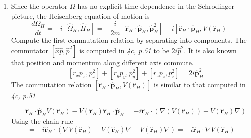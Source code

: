 \begin{sol}
\begin{enumerate}[label=\textbf{(\alph*)}]
\item
Since the operator $\Omega$ has no explicit time dependence in the Schrodinger picture, the Heisenberg equation of motion is
\begin{equation}
	\frac{d\Omega_H}{dt}=-i[\hat\Omega_H,\hat H_H]=-\frac{i}{2m}[\hat{\mathbf r}_H\cdot \hat{\mathbf p}_H,\hat{\mathbf p}_H^2]-i[\hat{\mathbf r}_H\cdot \hat{\mathbf p}_H,V(\hat {\mathbf{r}}_H)]
\end{equation}  
Compute the first commutation relation by separating into components. The commutator $[\hat x\hat p,\hat p^2]$ is computed in \textit{4c, p.51} to be $2i\hat p^2$. It is also known that position and momentum along different axis commute.
\begin{equation}
	[\hat{\mathbf r}_H\cdot \hat{\mathbf p}_H,\hat{\mathbf p}_H^2]=[r_xp_x,p_x^2]+[r_yp_y,p_y^2]+[r_zp_z,p_z^2]=2i\hat{\mathbf p}_H^2
\end{equation}
The commutation relation $[\hat{\mathbf r}_H\cdot \hat{\mathbf p}_H,V(\hat {\mathbf{r}}_H)]$ is similar to that computed in \textit{4c, p.51}

\begin{equation}
	[\hat{\mathbf r}_H\cdot \hat{\mathbf p}_H,V(\hat {\mathbf{r}}_H)]=\hat{\mathbf r}_H\cdot \hat{\mathbf p}_HV(\hat {\mathbf{r}}_H)-V(\hat {\mathbf{r}}_H)\hat{\mathbf r}_H\cdot \hat{\mathbf p}_H=-i\hat{ \mathbf r}_H\cdot(\nabla( V(\hat {\mathbf{r}}_H))-V(\hat {\mathbf{r}}_H)\nabla)
\end{equation} 
Using the chain rule
\begin{equation}
	=-i\hat{ \mathbf r}_H\cdot(\nabla V(\hat {\mathbf{r}}_H)+V(\hat {\mathbf{r}}_H)\nabla-V(\hat {\mathbf{r}}_H)\nabla)=-i\hat{ \mathbf r}_H\cdot\nabla V(\hat {\mathbf{r}}_H)
\end{equation}


\end{enumerate}
\end{sol}
